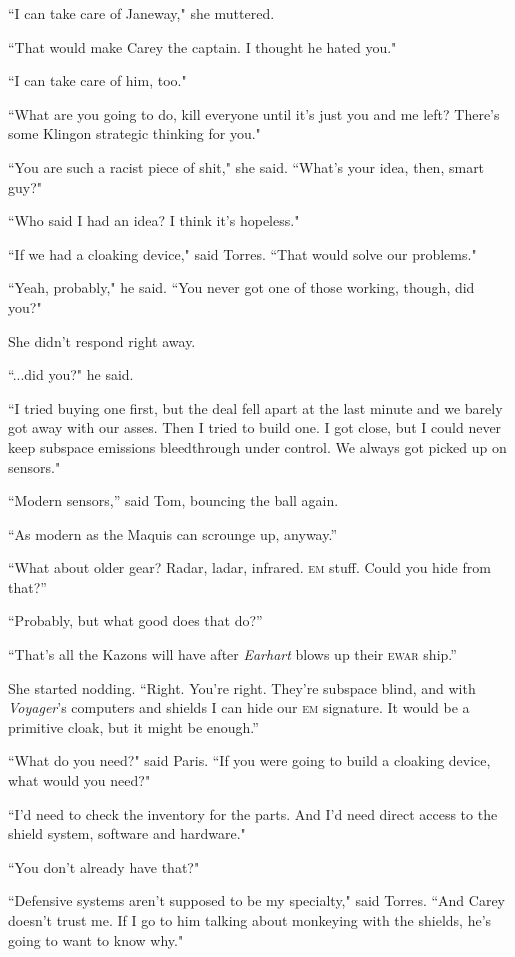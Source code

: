 \documentclass[twoside,letterpaper,12pt]{memoir}
\begin{document}
``I can take care of Janeway," she muttered. 

``That would make Carey the captain. I thought he hated you." 

``I can take care of him, too." 

``What are you going to do, kill everyone until it's just you and me left? There's some Klingon strategic thinking for you." 

``You are such a racist piece of shit," she said. ``What's your idea, then, smart guy?" 

``Who said I had an idea? I think it's hopeless." 

``If we had a cloaking device," said Torres. ``That would solve our problems." 

``Yeah, probably," he said. ``You never got one of those working, though, did you?" 

She didn't respond right away. 

``...did you?" he said. 

``I tried buying one first, but the deal fell apart at the last minute and we barely got away with our asses. Then I tried to build one. I got close, but I could never keep subspace emissions bleedthrough under control. We always got picked up on sensors." 

``Modern sensors,” said Tom, bouncing the ball again. 

``As modern as the Maquis can scrounge up, anyway.” 

“What about older gear? Radar, ladar, infrared. \textsc{em} stuff. Could you hide from that?” 

“Probably, but what good does that do?” 

“That’s all the Kazons will have after \textit{Earhart} blows up their \textsc{ewar} ship.” 

She started nodding. “Right. You’re right. They’re subspace blind, and with \textit{Voyager}’s computers and shields I can hide our \textsc{em} signature. It would be a primitive cloak, but it might be enough.” 

``What do you need?" said Paris. ``If you were going to build a cloaking device, what would you need?" 

``I'd need to check the inventory for the parts. And I'd need direct access to the shield system, software and hardware." 

``You don't already have that?" 

``Defensive systems aren't supposed to be my specialty," said Torres. ``And Carey doesn't trust me. If I go to him talking about monkeying with the shields, he's going to want to know why." 
\end{document}
